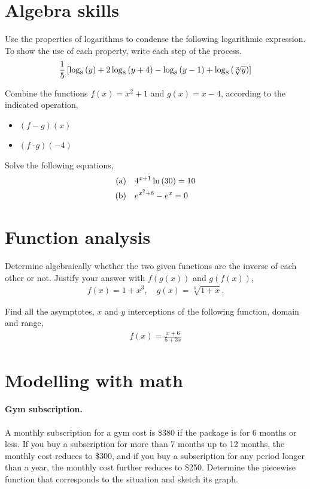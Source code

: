 \documentclass{tufte-handout} %
\begin{document}
\section{Algebra skills}

Use the properties of logarithms to condense the following logarithmic expression.
To show the use of each property, write each step of the process.
\begin{gather*}
    \frac{1}{5}\left[ \log_8\qty(y) + 2\log_8\qty(y+4) - \log_8\qty(y-1) + \log_8\qty(\sqrt[3]{y}) \right]
\end{gather*}


Combine the functions $f(x) = x^2+1$ and $g(x)=x-4$, according to the indicated operation,
\begin{itemize}
    \item $(f-g)(x)$
    \item $\left(f\cdot g\right)\left(-4\right)$
\end{itemize}

Solve the following equations,
\begin{align*}
    (\mathrm{a})\quad & 4^{x+1}\ln\qty(30) = 10 \\
    (\mathrm{b})\quad & e^{x^2+6} - e^x= 0 
\end{align*}

\section{Function analysis}

Determine algebraically whether the two given functions are the inverse of each other or not.
Justify your answer with $f(g(x))$ and $g(f(x))$,
\begin{gather*}
    f(x) = 1 +x^3,\quad g(x)=\sqrt[3]{1+x}.
\end{gather*}

Find all the asymptotes, $x$ and $y$ interceptions of the following function, domain and range,
\begin{gather*}
    f(x) = \frac{x+6}{5+3x}
\end{gather*}


\section{Modelling with math}

\paragraph{Gym subscription.} A monthly subscription for a gym cost is \$380 if the package is for 6 months or less.
If you buy a subscription for more than 7 months up to 12 months, the monthly cost reduces to \$300, and if you buy a subscription for any period longer than a year, the monthly cost further reduces to \$250.
Determine the piecewise function that corresponds to the situation and sketch its graph.
\end{document}
